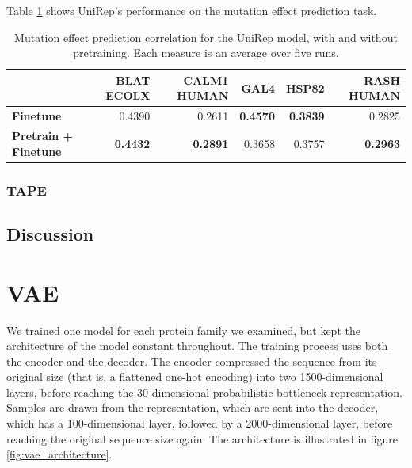 Table \ref{tab:unirep_mutation_results} shows UniRep's performance on the mutation effect prediction task.

\begin{table}[ht]
    \centering
    \begin{tabularx}{\textwidth}{lrrrrr}
    \hline
    & \textbf{BLAT ECOLX} & \textbf{CALM1 HUMAN} & \textbf{GAL4} & \textbf{HSP82} & \textbf{RASH HUMAN} \\ \hline
    \textbf{Finetune}            & 0.4390          & 0.2611          & \textbf{0.4570} & \textbf{0.3839} & 0.2825 \\
    \textbf{Pretrain + Finetune} & \textbf{0.4432} & \textbf{0.2891} & 0.3658          & 0.3757          & \textbf{0.2963} \\
    \hline
    \end{tabularx}
    \caption{Mutation effect prediction correlation for the UniRep model, with and without pretraining. Each measure is an average over five runs.}
    \label{tab:unirep_mutation_results}
\end{table}

\subsubsection{TAPE}


\subsection{Discussion}

\section{VAE}
\label{sec:variational_autoencoders_experiement}

We trained one model for each protein family we examined, but kept the architecture of the model constant throughout. The training process uses both the encoder and the decoder. The encoder compressed the sequence from its original size (that is, a flattened one-hot encoding) into two 1500-dimensional layers, before reaching the 30-dimensional probabilistic bottleneck representation. Samples are drawn from the representation, which are sent into the decoder, which has a 100-dimensional layer, followed by a 2000-dimensional layer, before reaching the original sequence size again. The architecture is illustrated in figure \ref{fig:vae_architecture}.

